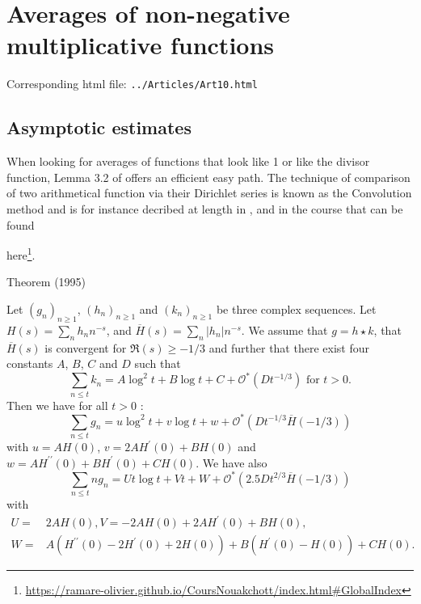 \chapter{   Averages of non-negative multiplicative functions}

Corresponding html file: \texttt{../Articles/Art10.html}










 
 





\section{Asymptotic estimates}


When looking for averages of functions that look like 1 or like the divisor
function, Lemma 3.2 of
\cite{Ramare*95} offers an
efficient easy path. The technique of comparison of two arithmetical function
via their Dirichlet series is known as the Convolution method and is for
instance decribed at length in 
\cite{Berment-Ramare*12}, and in
the course that can be found 

here\footnote{\url{https://ramare-olivier.github.io/CoursNouakchott/index.html#GlobalIndex}}.


\begin{thm}{Theorem (1995)}

Let $(g_n)_{n\ge1}$, $(h_n)_{n\ge1}$ and $(k_n)_{n\ge1}$ be three
complex sequences. Let $H(s)=\sum_nh_nn^{-s}$, and
$\overline{H}(s)=\sum_n|h_n|n^{-s}$.
We assume that $g=h\star k$, that $\overline{H}(s)$ is convergent for
$\Re(s)\ge-1/3$ and further that
there exist four constants $A$, $B$, $C$ and $D$ such that
$$
\sum_{n\le t}k_n
=
A\log^2t+B\log t+C+\mathcal{O}^*(D t^{-1/3})
\text{ for $t>0$.}
$$
Then we have for all $t>0$ :
$$
\sum_{n\le t}g_n
=
u\log^2t+v\log t+w+\mathcal{O}^*(D t^{-1/3}\overline{H}(-1/3))
$$
with
$u=AH(0)$, $v=2AH^{\prime}(0)+BH(0)$ and $w=AH^{\prime\prime}(0)+BH^{\prime}(0)+CH(0)$.
We have also
$$
\sum_{n\le t}ng_n
=
Ut\log t+Vt+W+\mathcal{O}^*(2.5D t^{2/3}\overline{H}(-1/3))
$$
with
$$
\begin{aligned}
U=&2AH(0), V=-2AH(0)+2AH^{\prime}(0)+BH(0),\\
W=&A(H^{\prime\prime}(0)-2H^{\prime}(0)+2H(0))+B(H^{\prime}(0)-H(0))+CH(0).
\end{aligned}
$$
\end{thm}

